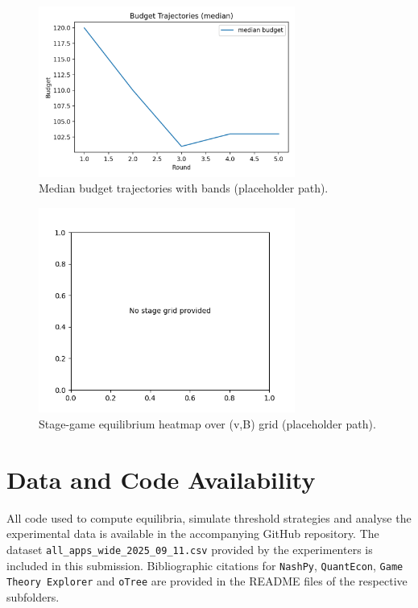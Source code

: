 \begin{figure}[H]
  \centering
  \includegraphics[width=0.75\textwidth]{figures/budget_trajectories.png}
  \caption{Median budget trajectories with bands (placeholder path).}
  \label{fig:budget_traj}
\end{figure}
\begin{figure}[H]
  \centering
  \includegraphics[width=0.75\textwidth]{figures/equilibrium_heatmap.png}
  \caption{Stage-game equilibrium heatmap over (v,B) grid (placeholder path).}
  \label{fig:eq_heatmap}
\end{figure}

\section*{Data and Code Availability}

All code used to compute equilibria, simulate threshold strategies and analyse the experimental data is available in the accompanying GitHub repository.  The dataset \texttt{all\_apps\_wide\_2025\_09\_11.csv} provided by the experimenters is included in this submission.  Bibliographic citations for \texttt{NashPy}, \texttt{QuantEcon}, \texttt{Game Theory Explorer} and \texttt{oTree} are provided in the README files of the respective subfolders.

\printbibliography


